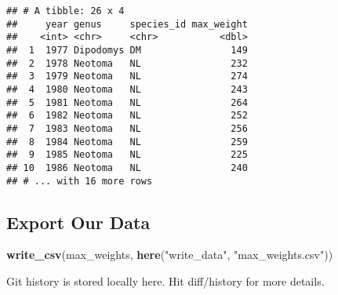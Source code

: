 \documentclass[]{article}
\newenvironment{Shaded}{\begin{snugshade}}{\end{snugshade}}
\newcommand{\KeywordTok}[1]{\textcolor[rgb]{0.13,0.29,0.53}{\textbf{#1}}}
\newcommand{\StringTok}[1]{\textcolor[rgb]{0.31,0.60,0.02}{#1}}
\newcommand{\CommentTok}[1]{\textcolor[rgb]{0.56,0.35,0.01}{\textit{#1}}}
\newcommand{\OperatorTok}[1]{\textcolor[rgb]{0.81,0.36,0.00}{\textbf{#1}}}
\newcommand{\NormalTok}[1]{#1}
\begin{document}
\begin{verbatim}
## # A tibble: 26 x 4
##     year genus     species_id max_weight
##    <int> <chr>     <chr>           <dbl>
##  1  1977 Dipodomys DM                149
##  2  1978 Neotoma   NL                232
##  3  1979 Neotoma   NL                274
##  4  1980 Neotoma   NL                243
##  5  1981 Neotoma   NL                264
##  6  1982 Neotoma   NL                252
##  7  1983 Neotoma   NL                256
##  8  1984 Neotoma   NL                259
##  9  1985 Neotoma   NL                225
## 10  1986 Neotoma   NL                240
## # ... with 16 more rows
\end{verbatim}

\begin{Shaded}
\end{Shaded}

\subsection{Export Our Data}\label{export-our-data}

\begin{Shaded}
\begin{Highlighting}[]
\KeywordTok{write_csv}\NormalTok{(max_weights, }\KeywordTok{here}\NormalTok{(}\StringTok{"write_data"}\NormalTok{, }\StringTok{"max_weights.csv"}\NormalTok{))}
\end{Highlighting}
\end{Shaded}

Git history is stored locally here. Hit diff/history for more details.
\end{document}
